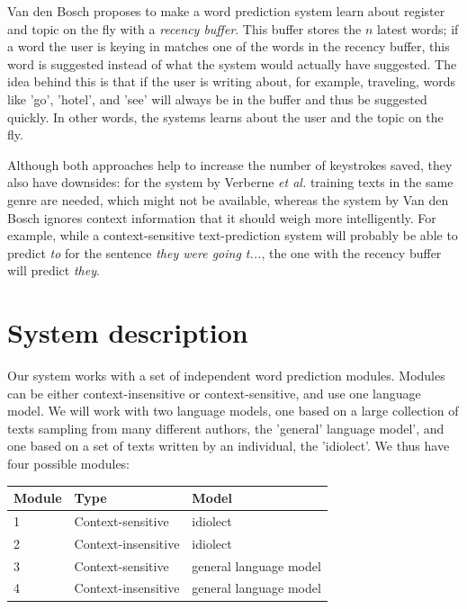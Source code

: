 \documentclass[11pt]{article}
\let\originaltable\table
\let\endoriginaltable\endtable
\renewenvironment{table}[1][ht]{%
  \originaltable[#1]
  \centering}%
  {\endoriginaltable}
\begin{document}
Van den Bosch  proposes to make a word prediction system learn about register and topic on the fly with a \emph{recency buffer}. This buffer stores the $n$ latest words; if a word the user is keying in matches one of the words in the recency buffer, this word is suggested instead of what the system would actually have suggested. The idea behind this is that if the user is writing about, for example, traveling, words like 'go', 'hotel', and 'see' will always be in the buffer and thus be suggested quickly. In other words, the systems learns about the user and the topic on the fly.

Although both approaches help to increase the number of keystrokes saved, they also have downsides: for the system by Verberne {\em et al.}  training texts in the same genre are needed, which might not be available, whereas the system by Van den Bosch  ignores context information that it should weigh more intelligently. For example, while a context-sensitive text-prediction system will probably be able to predict \emph{to} for the sentence \emph{they were going t...}, the one with the recency buffer will predict \emph{they}.


\section{System description} \label{algorithm}

Our system works with a set of independent word prediction modules. Modules can be either context-insensitive or context-sensitive, and use one language model. We will work with two language models, one based on a large collection of texts sampling from many different authors, the 'general' language model', and one based on a set of texts written by an individual, the 'idiolect'. We thus have four possible modules:

\begin{table}[h]
\begin{tabular}{lll} 
Module&Type&Model\\
\hline
1&Context-sensitive&idiolect\\
2&Context-insensitive&idiolect\\
3&Context-sensitive&general language model\\
4&Context-insensitive&general language model\\
\end{tabular} 
\caption{A possible module set-up for Xxx}
\end{table}
\end{document}

